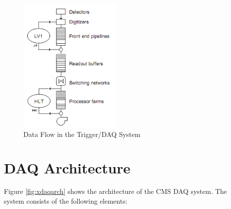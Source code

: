 \begin{figure}
	\centering
		\includegraphics[width=0.45\textwidth]{figures/triggerdaq.png}
	\caption{Data Flow in the Trigger/DAQ System}
	\label{fig:triggerdaq}
\end{figure}

\section{DAQ Architecture}
Figure \ref{fig:xdaqarch} shows the architecture of the CMS DAQ system. The system consists of the following elements:

